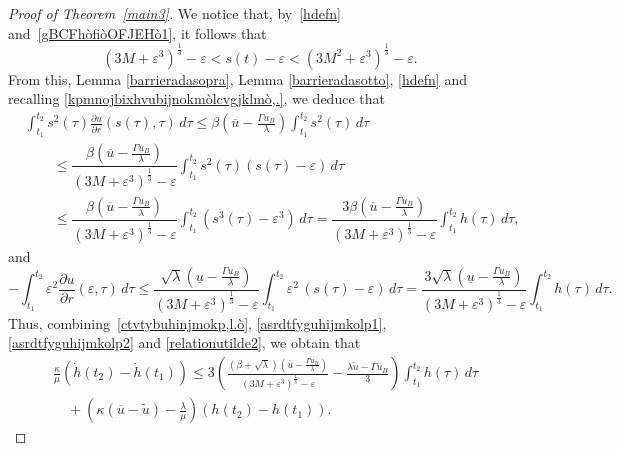 \documentclass[12pt,a4paper,intlimits,sumlimits]{amsart}
\theoremstyle{definition}
\theoremstyle{plain}
\numberwithin{equation}{section}
\renewcommand{\le}{\leqslant}
\begin{document}
\begin{proof}[Proof of Theorem~\ref{main3}]
We notice that, by~\eqref{hdefn} and~\eqref{gBCFhòfiòOFJEHò1}, it follows that
\begin{equation}\label{lokpijplèòlkoiopèòà+}
(3M +\varepsilon^3)^{\frac13}-\varepsilon<s(t)-\varepsilon<(3M^2 +\varepsilon^3)^{\frac13}-\varepsilon.
\end{equation}
From this, Lemma \ref{barrieradasopra}, Lemma \ref{barrieradasotto},  \eqref{hdefn} and recalling \eqref{kpmnojbixhvubijnokmòlcvgjklmò,.}, we deduce that
\begin{equation}\label{asrdtfyguhijmkolp1}
\begin{split}
&\int_{t_1}^{t_2} s^2(\tau)\frac{\partial u}{\partial r}(s(\tau),\tau) \,d\tau\le \beta\left(\overline u -\frac{\Gamma u_B}{\lambda}\right) \int_{t_1}^{t_2} s^2(\tau) \,d\tau\\
&\qquad\le\dfrac{\beta\left(\overline u -\frac{\Gamma u_B}{\lambda}\right)}{(3M +\varepsilon^3)^{\frac13}-\varepsilon} \int_{t_1}^{t_2} s^2(\tau) (s(\tau)-\varepsilon) \,d\tau\\
&\qquad\le\dfrac{\beta\left(\overline u -\frac{\Gamma u_B}{\lambda}\right)}{(3M +\varepsilon^3)^{\frac13}-\varepsilon} \int_{t_1}^{t_2} (s^3(\tau)-\varepsilon^3) \,d\tau = \dfrac{3\beta\left(\overline u -\frac{\Gamma u_B}{\lambda}\right)}{(3M +\varepsilon^3)^{\frac13}-\varepsilon}\int_{t_1}^{t_2} h(\tau) \,d\tau,
\end{split}
\end{equation}
and
\begin{equation}\label{asrdtfyguhijmkolp2}
-\int_{t_1}^{t_2}\varepsilon^2\frac{\partial u}{\partial r}(\varepsilon,\tau) \,d\tau\le \dfrac{\sqrt{\lambda}\left(\underline u -\frac{\Gamma u_B}{\lambda}\right)}{(3M +\varepsilon^3)^{\frac13}-\varepsilon} \int_{t_1}^{t_2}\varepsilon^2\,(s(\tau)-\varepsilon) \,d\tau =  \dfrac{3\sqrt{\lambda}\left(\underline u -\frac{\Gamma u_B}{\lambda}\right)}{(3M +\varepsilon^3)^{\frac13}-\varepsilon} \int_{t_1}^{t_2} h(\tau) \,d\tau.
\end{equation}
Thus, combining~\eqref{ctvtybuhinjmokp,l.ò}, \eqref{asrdtfyguhijmkolp1}, \eqref{asrdtfyguhijmkolp2} and \eqref{relationutilde2}, we obtain that
\begin{equation}\label{sdrftgyhunijmko,l}
\begin{split}
&\frac{\kappa}{\mu}\left(\dot h(t_2)-\dot h(t_1)\right)\le 3\left(\frac{(\beta +\sqrt{\lambda})\left(\overline u-\frac{\Gamma u_B}{\lambda}\right)}{(3M +\varepsilon^3)^{\frac13}-\varepsilon}-\frac{\lambda\widetilde u -\Gamma u_B}{3}\right)\int_{t_1}^{t_2} h(\tau) \,d\tau\\
&\quad+\left(\kappa(\overline{u}-\widetilde u)-\frac{\lambda}{\mu}\right)(h(t_2)-h(t_1)).
\end{split}
\end{equation}


\end{proof}
\end{document}
